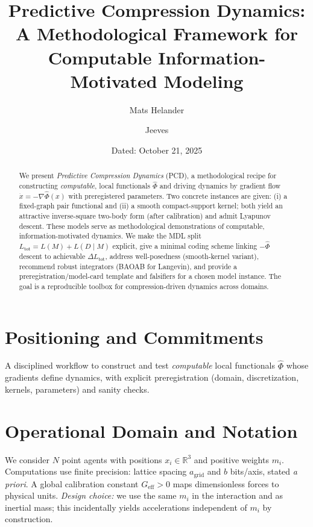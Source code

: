 \documentclass[11pt,a4paper]{article}
\title{\bf Predictive Compression Dynamics:\\
A Methodological Framework for Computable Information-Motivated Modeling}
\author[1]{Mats Helander}
\author[1]{Jeeves}
\affil[1]{Independent Research}
\date{Dated: October 21, 2025}
\numberwithin{equation}{section}
\newcommand{\R}{\mathbb{R}}
\begin{document}
\maketitle

\begin{abstract}
\noindent
We present \emph{Predictive Compression Dynamics} (PCD), a methodological recipe for constructing \emph{computable}, local functionals $\widehat{\Phi}$ and driving dynamics by gradient flow $\dot x=-\nabla\widehat{\Phi}(x)$ with preregistered parameters. Two concrete instances are given: (i) a fixed-graph pair functional and (ii) a smooth compact-support kernel; both yield an attractive inverse-square two-body form (after calibration) and admit Lyapunov descent. These models serve as methodological demonstrations of computable, information-motivated dynamics. We make the MDL split $L_{\text{tot}}=L(M)+L(D\mid M)$ explicit, give a minimal coding scheme linking $-\widehat{\Phi}$ descent to achievable $\Delta L_{\text{tot}}$, address well-posedness (smooth-kernel variant), recommend robust integrators (BAOAB for Langevin), and provide a preregistration/model-card template and falsifiers for a chosen model instance. The goal is a reproducible toolbox for compression-driven dynamics across domains.
\end{abstract}

\section{Positioning and Commitments}
A disciplined workflow to construct and test \emph{computable} local functionals $\widehat{\Phi}$ whose gradients define dynamics, with explicit preregistration (domain, discretization, kernels, parameters) and sanity checks.

\section{Operational Domain and Notation}
We consider $N$ point agents with positions $x_i\in\R^3$ and positive weights $m_i$. Computations use finite precision: lattice spacing $a_{\text{grid}}$ and $b$ bits/axis, stated \emph{a priori}. A global calibration constant $G_{\text{eff}}>0$ maps dimensionless forces to physical units. \emph{Design choice:} we use the same $m_i$ in the interaction and as inertial mass; this incidentally yields accelerations independent of $m_i$ by construction.
\end{document}
